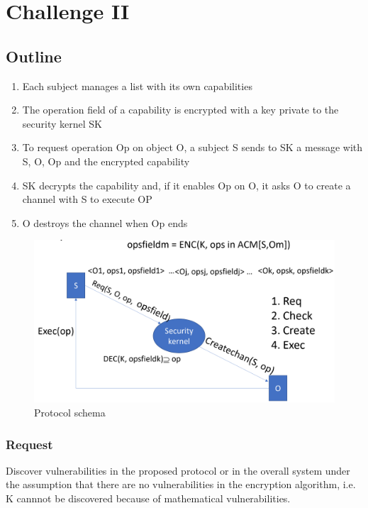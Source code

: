 \chapter{Challenge II}
\section{Outline}
\begin{enumerate}
   \item Each subject manages a list with its own capabilities
   
   \item The operation field of a capability is encrypted with a key private to the security kernel SK
   
   \item To request operation Op on object O, a subject S sends to SK a message with S, O, Op and the encrypted capability
   
   \item SK decrypts the capability and, if it enables Op on O, it asks O to create a channel with S to execute OP
   
   \item O destroys the channel when Op ends
\end{enumerate}

\begin{figure}[htbp]
   \centering
   \includegraphics{images/challenge_2.png}
   \caption{Protocol schema}
   \label{fig:challenge_2}
\end{figure}

\subsection{Request}
Discover vulnerabilities in the proposed protocol or in the overall system under the assumption that there are no vulnerabilities in the encryption algorithm,
i.e. K cannnot be discovered because of  mathematical vulnerabilities.

